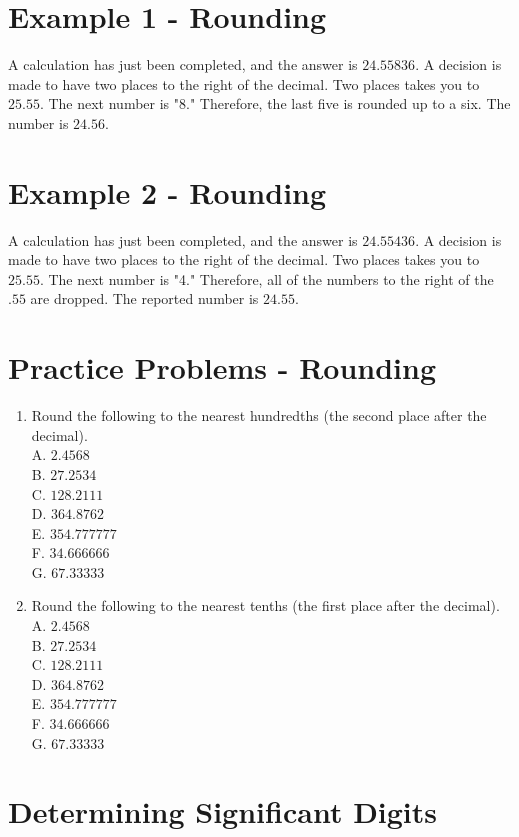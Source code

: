 \documentclass[10pt]{article}
\begin{document}
\section{Example 1 - Rounding}
A calculation has just been completed, and the answer is $24.55836$. A decision is made to have two places to the right of the decimal. Two places takes you to $25.55$. The next number is "8." Therefore, the last five is rounded up to a six. The number is $24.56$.

\section{Example 2 - Rounding}
A calculation has just been completed, and the answer is $24.55436$. A decision is made to have two places to the right of the decimal. Two places takes you to $25.55$. The next number is "4." Therefore, all of the numbers to the right of the $.55$ are dropped. The reported number is $24.55$.

\section{Practice Problems - Rounding}
\begin{enumerate}
  \item Round the following to the nearest hundredths (the second place after the decimal).\\
A. $2.4568$\\
B. $27.2534$\\
C. $128.2111$\\
D. $364.8762$\\
E. $354.777777$\\
F. $34.666666$\\
G. $67.33333$

  \item Round the following to the nearest tenths (the first place after the decimal).\\
A. $2.4568$\\
B. $27.2534$\\
C. $128.2111$\\
D. $364.8762$\\
E. $354.777777$\\
F. $34.666666$\\
G. $67.33333$

\end{enumerate}
\section{Determining Significant Digits}
\end{document}

